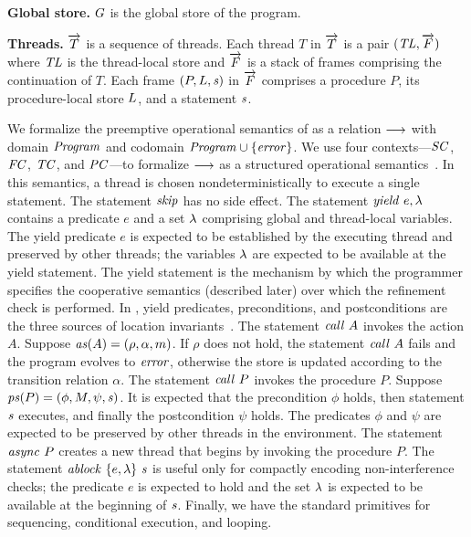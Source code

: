 \noindent
{\bf Global store.}
$G$ is the global store of the program.

\noindent
{\bf Threads.}
$\overrightarrow{T}$ is a sequence of threads.
Each thread $T$ in $\overrightarrow{T}$ is a pair $(\mathit{TL}, \overrightarrow{F})$ where
$\mathit{TL}$ is the thread-local store and $\overrightarrow{F}$ is a stack of frames comprising the continuation of $T$.  
Each frame $(P, L, \mathit{s})$ in $\overrightarrow{F}$ comprises a procedure $P$, its procedure-local store $L$, 
and a statement $\mathit{s}$.

We formalize the preemptive operational semantics of \civl as a relation $\longrightarrow$ with domain $\mathit{Program}$ and 
codomain $\mathit{Program} \cup \{\mathit{error}\}$.
We use four contexts---$\mathit{SC}$, $\mathit{FC}$, $\mathit{TC}$, and $\mathit{PC}$---to formalize $\longrightarrow$
as a structured operational semantics~\cite{WrightF94}.
In this semantics, a thread is chosen nondeterministically to execute a single statement.
The statement $\mathit{skip}$ has no side effect.
The statement $\mathit{yield}\ e,\lambda$ contains a predicate $e$ and a set $\lambda$ comprising global and thread-local variables.
The yield predicate $e$ is expected to be established by the executing thread and preserved by other threads;
the variables $\lambda$ are expected to be available at the yield statement.
The yield statement is the mechanism by which the programmer specifies the cooperative semantics (described later) over which 
the refinement check is performed.
In \civl, yield predicates, preconditions, and postconditions are the three sources of location invariants~\cite{OwickiG76}.
The statement $\mathit{call}\ A$ invokes the action $A$.
Suppose $\mathit{as}(A) = (\rho, \alpha, m)$.
If $\rho$ does not hold, the statement $\mathit{call}\ A$ fails and the program evolves to $\mathit{error}$, 
otherwise the store is updated according to the transition relation $\alpha$.
The statement $\mathit{call}\ P$ invokes the procedure $P$.
Suppose $\mathit{ps}(P) = (\phi, M, \psi, \mathit{s})$.
It is expected that the precondition $\phi$ holds, then statement $\mathit{s}$ executes, and finally the postcondition $\psi$ holds.
The predicates $\phi$ and $\psi$ are expected to be preserved by other threads in the environment. 
The statement $\mathit{async}\ P$ creates a new thread that begins by invoking the procedure $P$.
The statement $\mathit{ablock}\ {\{e,\lambda\}}\ {\mathit{s}}$ is useful only for compactly encoding non-interference checks;
the predicate $e$ is expected to hold and the set $\lambda$ is expected to be available at the beginning of $\mathit{s}$.
Finally, we have the standard primitives for sequencing, conditional execution, and looping.

